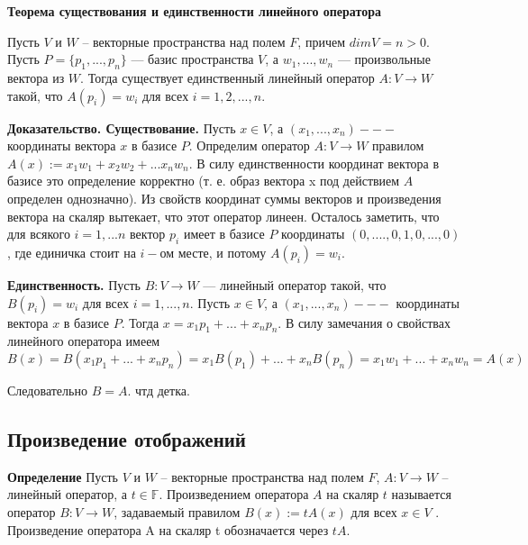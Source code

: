 \documentclass[a4paper]{article}
\begin{document}
    \begin{htheorem}
        \textbf{Теорема существования и единственности линейного оператора}

        Пусть $V$ и $W$ – векторные пространства над полем $F$, причем $dim V = n > 0$. Пусть $P = \{ p_1, ..., p_n \}$ --- базис пространства $V$, а $w_1, ..., w_n$ --- произвольные вектора из $W$. Тогда существует
        единственный линейный оператор $A: V \rightarrow W$ такой, что $A(p_i) = w_i$ для всех $i = 1, 2, ..., n$.
    \end{htheorem}


    \begin{hproof}
        \textbf{Доказательство. Существование.} Пусть $x \in V$, а $(x_1, ..., x_n) --- $ координаты вектора $x$ в базисе $P$. Определим оператор $A: V \rightarrow W$ правилом $A(x) := x_1w_1+x_2w_2+...x_nw_n$. В силу единственности координат вектора в базисе это определение корректно (т. е. образ вектора x под действием $A$ определен однозначно). Из свойств координат суммы векторов и произведения вектора на скаляр вытекает, что этот оператор
        линеен. Осталось заметить, что для всякого $i = 1,...n$ вектор $p_i$ имеет в базисе $P$ координаты $(0,....,0,1,0,...,0)$, где единичка стоит на $i-$ом месте, и потому $A(p_i) = w_i$.

        \textbf{Единственность.} Пусть $B: V \rightarrow W$ --- линейный оператор такой, что $B(p_i) = w_i$ для всех $i = 1,...,n$. Пусть $x \in V$, а $(x_1, ..., x_n) --- $ координаты вектора $x$ в базисе $P$. Тогда $x = x_1p_1 + ... + x_np_n$. В силу замечания о свойствах линейного оператора имеем
        \begin{equation}
            B(x) = B(x_1p_1 + ... + x_np_n) = x_1B(p_1) + ... + x_nB(p_n) = x_1w_1 + ... + x_nw_n = A(x)
        \end{equation}

        Следовательно $B=A$. чтд детка.
    \end{hproof}



    \subsection*{Произведение отображений}
    \textbf{Определение} Пусть $V$ и $W$ – векторные пространства над полем $F$, $A: V \rightarrow W$ –
    линейный оператор, а $t \in \mathbb{F}$. Произведением оператора $A$ на скаляр $t$
    называется оператор $B: V \rightarrow W$, задаваемый правилом $B(x) := tA(x)$ для
    всех $x \in V$ . Произведение оператора A на скаляр t обозначается через $tA$.
\end{document}
